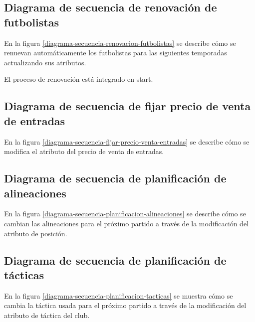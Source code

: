  \newpage

\subsection*{Diagrama de secuencia de renovación de futbolistas}
En la figura \ref{diagrama-secuencia-renovacion-futbolistas} se describe cómo se
renuevan automáticamente los futbolistas para las siguientes temporadas
actualizando sus atributos.


El proceso de renovación está integrado en start.  \newpage

\subsection*{Diagrama de secuencia de fijar precio de venta de entradas}
En la figura \ref{diagrama-secuencia-fijar-precio-venta-entradas} se describe
cómo se modifica el atributo del precio de venta de entradas.


\subsection*{Diagrama de secuencia de planificación de alineaciones}
En la figura \ref{diagrama-secuencia-planificacion-alineaciones} se describe
cómo se cambian las alineaciones para el próximo partido a través de la
modificación del atributo de posición.


\subsection*{Diagrama de secuencia de planificación de tácticas}
En la figura \ref{diagrama-secuencia-planificacion-tacticas} se muestra cómo se
cambia la táctica usada para el próximo partido a través de la modificación del
atributo de táctica del club.

